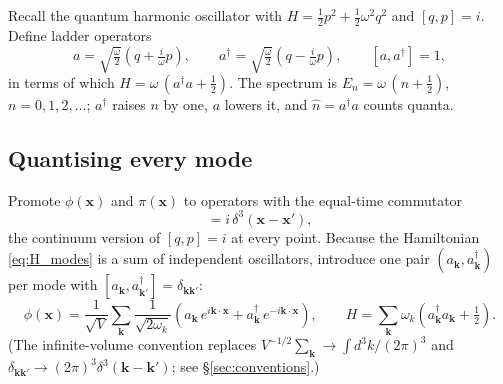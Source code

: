 \documentclass[12pt]{article}
\newcommand{\bk}{\mathbf{k}}
\newcommand{\bx}{\mathbf{x}}
\begin{document}
Recall the quantum harmonic oscillator with
$H = \tfrac{1}{2}p^2 + \tfrac{1}{2}\omega^2 q^2$ and $[q,p]=i$.
Define ladder operators
%
\begin{equation}
  a = \sqrt{\tfrac{\omega}{2}}\left(q + \tfrac{i}{\omega}p\right),
  \qquad
  a^\dagger = \sqrt{\tfrac{\omega}{2}}\left(q - \tfrac{i}{\omega}p\right),
  \qquad
  [a, a^\dagger] = 1,
\end{equation}
%
in terms of which $H = \omega\,(a^\dagger a + \tfrac{1}{2})$.  The
spectrum is $E_n = \omega\,(n + \tfrac{1}{2})$, $n = 0,1,2,\dots$;
$a^\dagger$ raises $n$ by one, $a$ lowers it, and
$\hat n = a^\dagger a$ counts quanta.

\subsection{Quantising every mode}
\label{sec:field_quant}

Promote $\phi(\bx)$ and $\pi(\bx)$ to operators with the equal-time
commutator
%
\begin{equation}
  [\hat\phi(\bx), \hat\pi(\bx')] = i\,\delta^3(\bx - \bx'),
\end{equation}
%
the continuum version of $[q,p]=i$ at every point.  Because the
Hamiltonian \eqref{eq:H_modes} is a sum of independent oscillators,
introduce one pair $(a_\bk, a^\dagger_\bk)$ per mode with
$[a_\bk, a^\dagger_{\bk'}] = \delta_{\bk\bk'}$:
%
\begin{equation}
  \hat\phi(\bx)
    = \frac{1}{\sqrt V}\sum_\bk \frac{1}{\sqrt{2\omega_k}}
      \left( a_\bk\, e^{i\bk\cdot\bx}
           + a^\dagger_\bk\, e^{-i\bk\cdot\bx} \right),
  \qquad
  H = \sum_\bk \omega_k \left( a^\dagger_\bk a_\bk
        + \tfrac{1}{2} \right).
  \label{eq:mode_expansion}
\end{equation}
%
(The infinite-volume convention replaces $V^{-1/2}\sum_\bk \to
\int\! d^3k/(2\pi)^3$ and $\delta_{\bk\bk'} \to
(2\pi)^3\delta^3(\bk-\bk')$; see \S\ref{sec:conventions}.)
\end{document}
